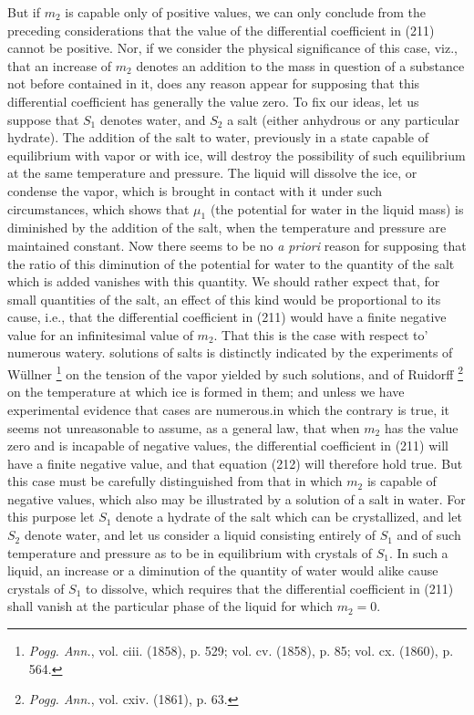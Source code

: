 \documentclass[12pt]{memoir}
\begin{document}
But if $m_2$ is capable only of positive values, we can only conclude from the preceding considerations that the value of the differential coefficient in (211) cannot be positive. Nor, if we consider the physical significance of this case, viz., that an increase of $m_2$ denotes an addition to the mass in question of a substance not before contained in it, does any reason appear for supposing that this differential coefficient has generally the value zero. To fix our ideas, let us suppose that $S_1$ denotes water, and $S_2$ a salt (either anhydrous or any particular hydrate). The addition of the salt to water, previously in a state capable of equilibrium with vapor or with ice, will destroy the possibility of such equilibrium at the same temperature and pressure. The liquid will dissolve the ice, or condense the vapor, which is brought in contact with it under such circumstances, which shows that $\mu_1$ (the potential for water in the liquid mass) is diminished by the addition of the salt, when the temperature and pressure are maintained constant. Now there seems to be no \textit{a priori} reason for supposing that the ratio of this diminution of the potential for water to the quantity of the salt which is added vanishes with this quantity. We should rather expect that, for small quantities of the salt, an effect of this kind would be proportional to its cause, i.e., that the differential coefficient in (211) would have a finite negative value for an infinitesimal value of
$m_2$. That this is the case with respect to' numerous watery. solutions of salts is distinctly indicated by the experiments of Wüllner \footnote{\textit{Pogg. Ann.}, vol. ciii. (1858), p. 529; vol. cv. (1858), p. 85; vol. cx. (1860), p. 564.} on the tension of the vapor yielded by such solutions, and of Ruidorff \footnote{\textit{Pogg. Ann.}, vol. cxiv. (1861), p. 63.} on the temperature at which ice is formed in them; and unless we have experimental evidence that cases are numerous.in which the contrary is true, it seems not unreasonable to assume, as a general law, that when $m_2$ has the value zero and is incapable of negative values, the differential coefficient in (211) will have a finite negative value, and that equation (212) will therefore hold true. But this case must be carefully distinguished from that in which $m_2$ is capable of negative values, which also may be illustrated by a solution of a salt in water. For this purpose let $S_1$ denote a hydrate of the salt which can be crystallized, and let $S_2$ denote water, and let us consider a liquid consisting entirely of $S_1$ and of such temperature and pressure as to be in equilibrium with crystals of $S_1$. In such a liquid, an increase or a diminution of the quantity of water would alike cause crystals of $S_1$ to dissolve, which requires that the differential coefficient in (211) shall vanish at the particular phase of the liquid for which $m_2 = 0$.
\end{document}
